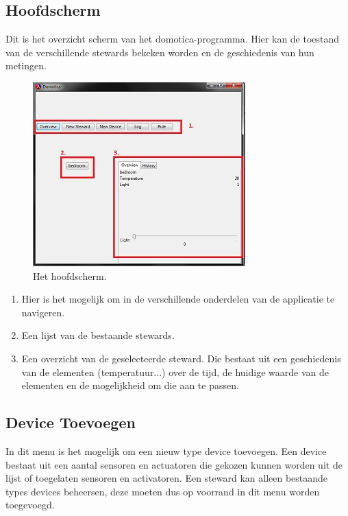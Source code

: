\documentclass{article}
\begin{document}
		\subsection{Hoofdscherm}
		\label{main-menu}
	Dit is het overzicht scherm van het domotica-programma. Hier kan de toestand van de verschillende stewards bekeken worden en de geschiedenis van hun metingen.
	
		\newpage
	
		\begin{figure}
			\begin{center}
				\includegraphics{../screenshot/main-menu.jpg}
			\end{center}
			\caption{Het hoofdscherm.}
		\end{figure}
	
	\begin{enumerate}
		\item Hier is het mogelijk om in de verschillende onderdelen van de applicatie te navigeren.
		\item Een lijst van de bestaande stewards.
		\item Een overzicht van de geselecteerde steward. Die bestaat uit een geschiedenis van de elementen (temperatuur...) over de tijd, de huidige waarde van de elementen en de mogelijkheid om 	die aan te passen.
	\end{enumerate}
	
		\subsection{Device Toevoegen}
		\label{add-device}
	In dit menu is het mogelijk om een nieuw type device toevoegen. Een device bestaat uit een aantal sensoren en actuatoren die gekozen kunnen worden uit de lijst of toegelaten sensoren en activatoren. Een steward kan alleen bestaande types devices beheersen, deze moeten dus op voorrand in dit menu worden toegevoegd.
	
\end{document}
